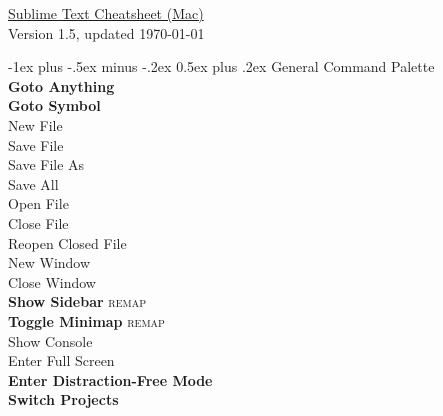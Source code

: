 \documentclass[10pt,landscape]{article}
\makeatletter
\renewcommand{\section}{\@startsection{section}{1}{0mm}%
                                {-1ex plus -.5ex minus -.2ex}%
                                {0.5ex plus .2ex}%
                                {\normalfont\large\bfseries}}
\makeatother
\begin{document}
\raggedright
\footnotesize
\begin{multicols}{3}

\setlength{\premulticols}{1pt}
\setlength{\postmulticols}{1pt}
\setlength{\multicolsep}{1pt}
\setlength{\columnsep}{2pt}

\begin{center}
     \large{\underline{Sublime Text Cheatsheet (Mac)}} \\
     \small{Version 1.5, updated \today}
\end{center}

\vspace*{-\baselineskip}
\section{General}
 Command Palette \\
 \textbf{Goto Anything} \\
 \textbf{Goto Symbol} \\
 New File \\
 Save File \\
 Save File As \\
 Save All \\
 Open File \\
 Close File \\
 Reopen Closed File \\
 New Window \\
 Close Window \\
 \textbf{Show Sidebar} \textsc{remap} \\
 \textbf{Toggle Minimap} \textsc{remap} \\
 Show Console \\
 Enter Full Screen \\
 \textbf{Enter Distraction-Free Mode} \\
 \textbf{Switch Projects}


\end{multicols}
\end{document}

